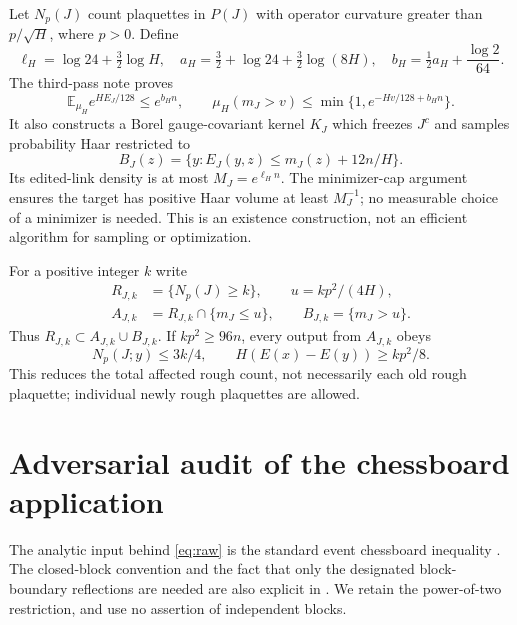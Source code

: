 \documentclass[11pt]{article}
\theoremstyle{definition}
\theoremstyle{remark}
\newcommand{\E}{\mathbb E}
\begin{document}
Let $N_p(J)$ count plaquettes in $P(J)$ with operator curvature greater
than $p/\sqrt H$, where $p>0$. Define
\begin{equation}
 \ell_H=\log24+\tfrac32\log H,\quad
 a_H=\tfrac32+\log24+\tfrac32\log(8H),\quad
 b_H=\tfrac12a_H+\frac{\log2}{64}.
 \label{eq:constants}
\end{equation}
The third-pass note \cite{third} proves
\begin{equation}
 \E_{\mu_H}e^{HE_J/128}\le e^{b_Hn},\qquad
 \mu_H(m_J>v)\le\min\{1,e^{-Hv/128+b_Hn}\}.
 \label{eq:raw}
\end{equation}
It also constructs a Borel gauge-covariant kernel $K_J$ which freezes
$J^c$ and samples probability Haar restricted to
\[
 B_J(z)=\{y:E_J(y,z)\le m_J(z)+12n/H\}.
\]
Its edited-link density is at most $M_J=e^{\ell_Hn}$. The minimizer-cap
argument ensures the target has positive Haar volume at least $M_J^{-1}$;
no measurable choice of a minimizer is needed. This is an existence
construction, not an efficient algorithm for sampling or optimization.

For a positive integer $k$ write
\begin{equation}
 \begin{split}
 R_{J,k}&=\{N_p(J)\ge k\},\qquad u=kp^2/(4H),\\
 A_{J,k}&=R_{J,k}\cap\{m_J\le u\},\qquad
 B_{J,k}=\{m_J>u\}.
 \end{split}
 \label{eq:events}
\end{equation}
Thus $R_{J,k}\subset A_{J,k}\cup B_{J,k}$. If $kp^2\ge96n$, every
output from $A_{J,k}$ obeys
\begin{equation}
 N_p(J;y)\le3k/4,\qquad H(E(x)-E(y))\ge kp^2/8.
 \label{eq:gain}
\end{equation}
This reduces the total affected rough count, not necessarily each old
rough plaquette; individual newly rough plaquettes are allowed.

\section{Adversarial audit of the chessboard application}
\label{sec:audit}
The analytic input behind \eqref{eq:raw} is the standard event chessboard
inequality \cite[\S2.2, Theorem 2.4]{bk}. The closed-block convention and
the fact that only the designated block-boundary reflections are needed
are also explicit in \cite[\S5.3, Theorem 5.8]{notes}. We retain the
power-of-two restriction, and use no assertion of independent blocks.
\end{document}
